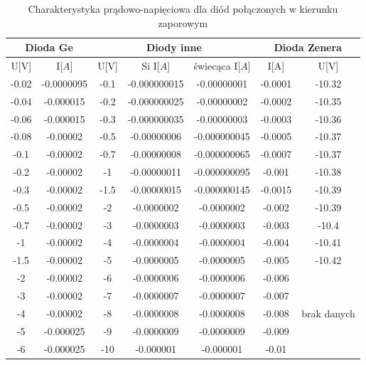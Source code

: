 \documentclass{article}
\begin{document}
\begin{table}[h!tbp]
\begin{center}
\begin{tabular}{|c|c|c|c|c|c|c|}
\hline
\multicolumn{2}{|c}{Dioda Ge} & \multicolumn{3}{|c}{Diody inne} & \multicolumn{2}{|c|}{Dioda Zenera} \\ \hline
U[V] & I[$A$] & U[V] & Si I[$A$] & świecąca I[$A$] & I[A] & U[V]\\ \hline
-0.02 & -0.0000095 & -0.1 & -0.000000015 & -0.00000001 & -0.0001 & -10.32 \\ \hline
-0.04 & -0.000015 & -0.2 & -0.000000025 & -0.00000002 & -0.0002 & -10.35 \\ \hline
-0.06 & -0.000015 & -0.3 & -0.000000035 & -0.00000003 & -0.0003 & -10.36 \\ \hline
-0.08 & -0.00002 & -0.5 & -0.00000006 & -0.000000045 & -0.0005 & -10.37 \\ \hline
-0.1 & -0.00002 & -0.7 & -0.00000008 & -0.000000065 & -0.0007 & -10.37 \\ \hline
-0.2 & -0.00002 & -1 & -0.00000011 & -0.000000095 & -0.001 & -10.38 \\ \hline
-0.3 & -0.00002 & -1.5 & -0.00000015 & -0.000000145 & -0.0015 & -10.39 \\ \hline
-0.5 & -0.00002 & -2 & -0.0000002 & -0.0000002 & -0.002 & -10.39 \\ \hline
-0.7 & -0.00002 & -3 & -0.0000003 & -0.0000003 & -0.003 & -10.4 \\ \hline
-1 & -0.00002 & -4 & -0.0000004 & -0.0000004 & -0.004 & -10.41 \\ \hline
-1.5 & -0.00002 & -5 & -0.0000005 & -0.0000005 & -0.005 & -10.42 \\ \hline
-2 & -0.00002 & -6 & -0.0000006 & -0.0000006 & -0.006 & \multirow{5}{*}{brak danych} \\ \cline{1-6}
-3 & -0.00002 & -7 & -0.0000007 & -0.0000007 & -0.007 &\\ \cline{1-6}
-4 & -0.00002 & -8 & -0.0000008 & -0.0000008 & -0.008 &\\ \cline{1-6}
-5 & -0.000025 & -9 & -0.0000009 & -0.0000009 & -0.009 & \\ \cline{1-6}
-6 & -0.000025 & -10 & -0.000001 & -0.000001 & -0.01  &\\ \hline
\end{tabular}
\end{center}
\label{fig:table2}
\caption{Charakterystyka prądowo-napięciowa dla diód połączonych w kierunku zaporowym}
\end{table}
\end{document}
